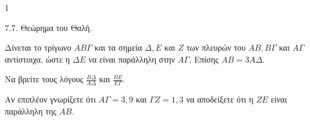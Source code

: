 \begin{ylh}{1}
    \item 7.7. Θεώρημα του Θαλή.
\end{ylh}
\begin{figure}
    \centering
\end{figure}
Δίνεται το τρίγωνο $ΑΒΓ$ και τα σημεία $Δ, Ε$ και $Ζ$ των πλευρών του $ΑΒ, ΒΓ$ και $ΑΓ$ αντίστοιχα, ώστε η $ΔΕ$ να είναι παράλληλη στην $ΑΓ$. Επίσης $ΑΒ = 3ΑΔ$.
\begin{alist}
\item Να βρείτε τους λόγους $\frac{ΒΔ}{ΑΔ}$ και $\frac{ΒΕ}{ΕΓ}$. 
\item Αν επιπλέον γνωρίζετε ότι $ΑΓ = 3,9$ και $ΓΖ = 1,3$ να αποδείξετε ότι η $ΖΕ$ είναι παράλληλη της $ΑΒ$. 
\end{alist}